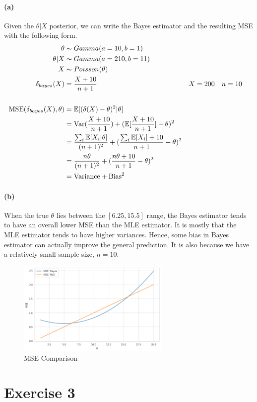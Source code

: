 \documentclass[11pt, letterpaper]{article}
\begin{document}
\paragraph{(a)}
Given the $\theta|X$ posterior, we can write the Bayes estimator and the resulting MSE with the following form.
\begin{align*}
    \theta &\thicksim Gamma(a=10, b=1) \\
    \theta|X &\thicksim Gamma(a=210, b=11) \\
    X &\thicksim Poisson(\theta) \\
    \delta_{bayes}(X) &= \frac{X+10}{n+1} && X=200 \quad n=10 \\ \\ 
    \text{MSE}(\delta_{bayes}(X), \theta) &= \mathbb{E}[(\delta(X) - \theta)^2|\theta] \\
        &= \text{Var}(\frac{X+10}{n+1}) + (\mathbb{E}[\frac{X+10}{n+1}] - \theta)^2 \\
        &= \frac{\sum_i \mathbb{E}[X_i|\theta]}{(n+1)^2} + (\frac{\sum_i \mathbb{E}[X_i] + 10}{n+1} - \theta)^2\\
        &= \frac{n\theta}{(n+1)^2} + (\frac{n\theta + 10}{n+1} - \theta)^2 \\
        &= \text{Variance} + \text{Bias}^2
\end{align*}

\paragraph{(b)}
When the true $\theta$ lies between the $[6.25, 15.5]$ range, the Bayes estimator tends to have an overall lower MSE than the MLE estimator. It is mostly that the MLE estimator tends to have higher variances. Hence, some bias in Bayes estimator can actually improve the general prediction. It is also because we have a relatively small sample size, $n = 10$.

\begin{figure}[!h]
  \centering
  \includegraphics[width=0.65\textwidth]{2.a.png}
  \captionsetup{justification=centering}
  \caption{MSE Comparison}
\end{figure}

\section{Exercise 3}
\end{document}
